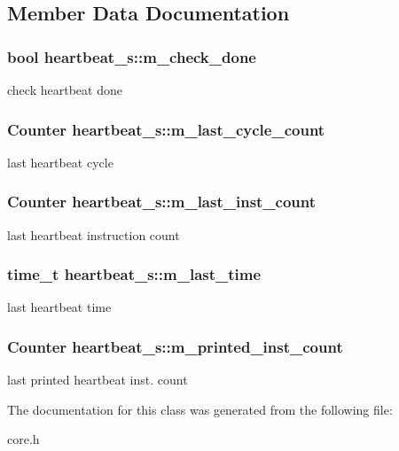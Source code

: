 \subsection{Member Data Documentation}
\hypertarget{classheartbeat__s_a2f60e13291b10f04e59c939a69e4a0c2}{
\subsubsection[{m\_\-check\_\-done}]{\setlength{\rightskip}{0pt plus 5cm}bool {\bf heartbeat\_\-s::m\_\-check\_\-done}}}
\label{classheartbeat__s_a2f60e13291b10f04e59c939a69e4a0c2}
check heartbeat done \hypertarget{classheartbeat__s_abbd4a34932700b419cf5280c4312cf26}{
\subsubsection[{m\_\-last\_\-cycle\_\-count}]{\setlength{\rightskip}{0pt plus 5cm}Counter {\bf heartbeat\_\-s::m\_\-last\_\-cycle\_\-count}}}
\label{classheartbeat__s_abbd4a34932700b419cf5280c4312cf26}
last heartbeat cycle \hypertarget{classheartbeat__s_ac0d7c13f8059c23889afd5eaef31b1ab}{
\subsubsection[{m\_\-last\_\-inst\_\-count}]{\setlength{\rightskip}{0pt plus 5cm}Counter {\bf heartbeat\_\-s::m\_\-last\_\-inst\_\-count}}}
\label{classheartbeat__s_ac0d7c13f8059c23889afd5eaef31b1ab}
last heartbeat instruction count \hypertarget{classheartbeat__s_ae4f0ac39db73c478b5e04184ee181f26}{
\subsubsection[{m\_\-last\_\-time}]{\setlength{\rightskip}{0pt plus 5cm}time\_\-t {\bf heartbeat\_\-s::m\_\-last\_\-time}}}
\label{classheartbeat__s_ae4f0ac39db73c478b5e04184ee181f26}
last heartbeat time \hypertarget{classheartbeat__s_a7e633443bf9e165d5525f99b3a1e37e8}{
\subsubsection[{m\_\-printed\_\-inst\_\-count}]{\setlength{\rightskip}{0pt plus 5cm}Counter {\bf heartbeat\_\-s::m\_\-printed\_\-inst\_\-count}}}
\label{classheartbeat__s_a7e633443bf9e165d5525f99b3a1e37e8}
last printed heartbeat inst. count 

The documentation for this class was generated from the following file:\begin{DoxyCompactItemize}
\item 
core.h\end{DoxyCompactItemize}

